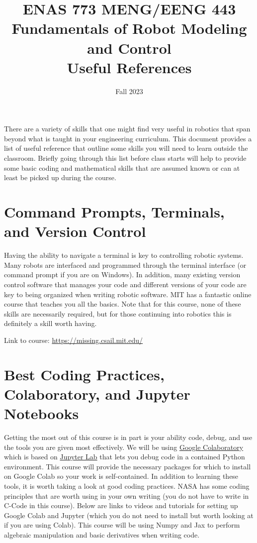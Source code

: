\documentclass[11pt,letterpaper]{article}
\title{ENAS 773 MENG/EENG 443  \\ Fundamentals of Robot Modeling and Control\\ Useful References}
\author{Fall 2023}
\date{}
\begin{document}
\maketitle

There are a variety of skills that one might find very useful in robotics that span beyond what is taught in your engineering curriculum. This document provides a list of useful reference that outline some skills you will need to learn outside the classroom. Briefly going through this list before class starts will help to provide some basic coding and mathematical skills that are assumed known or can at least be picked up during the course. 

\section*{Command Prompts, Terminals, and Version Control}

Having the ability to navigate a terminal is key to controlling robotic systems. Many robots are interfaced and programmed through the terminal interface (or command prompt if you are on Windows). In addition, many existing version control software that manages your code and different versions of your code are key to being organized when writing robotic software. MIT has a fantastic online course that teaches you all the basics. Note that for this course, none of these skills are necessarily required, but for those continuing into robotics this is definitely a skill worth having. 

Link to course: \href{https://missing.csail.mit.edu/}{https://missing.csail.mit.edu/}

\section*{Best Coding Practices, Colaboratory, and Jupyter Notebooks} 

Getting the most out of this course is in part is your ability code, debug, and use the tools you are given most effectively. We will be using \href{https://colab.research.google.com/?utm_source=scs-index}{Google Colaboratory} which is based on \href{https://jupyter.org/try-jupyter/retro/notebooks/?path=notebooks/Intro.ipynb}{Jupyter Lab} that lets you debug code in a contained Python environment. This course will provide the necessary packages for which to install on Google Colab so your work is self-contained. In addition to learning these tools, it is worth taking a look at good coding practices. NASA has some coding principles that are worth using in your own writing (you do not have to write in C-Code in this course). Below are links to videos and tutorials for setting up Google Colab and Jupyter (which you do not need to install but worth looking at if you are using Colab). This course will be using Numpy and Jax to perform algebraic manipulation and basic derivatives when writing code. 
\end{document}
